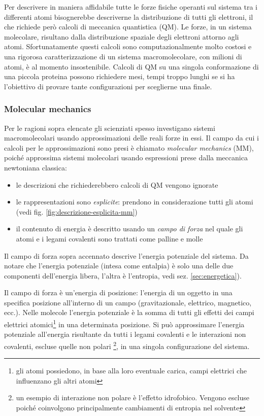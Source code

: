 \par Per descrivere in maniera affidabile tutte le forze fisiche operanti sul sistema tra i differenti atomi bisognerebbe descriverne la distribuzione di tutti gli elettroni, il che richiede però calcoli di meccanica quantistica (QM). Le forze, in un sistema molecolare, risultano dalla distribuzione spaziale degli elettroni attorno agli atomi. Sfortunatamente questi calcoli sono computazionalmente molto costosi e una rigorosa caratterizzazione di un sistema macromolecolare, con milioni di atomi, è al momento insostenibile. Calcoli di QM su una singola conformazione di una piccola proteina possono richiedere mesi, tempi troppo lunghi se si ha l'obiettivo di provare tante configurazioni per sceglierne una finale. 

\subsubsection{Molecular mechanics}

\par Per le ragioni sopra elencate gli scienziati spesso investigano sistemi macromolecolari usando approssimazioni delle reali forze in essi. Il campo da cui i calcoli per le approssimazioni sono presi è chiamato \textit{molecular mechanics} (MM), poiché approssima sistemi molecolari usando espressioni prese dalla meccanica newtoniana classica:
\begin{itemize}
	\item le descrizioni che richiederebbero calcoli di QM vengono ignorate
	\item le rappresentazioni sono \textit{esplicite}: prendono in considerazione tutti gli atomi (vedi fig. \ref{fig:descrizione-esplicita-mm})
	\item il contenuto di energia è descritto usando un \textit{campo di forza} nel quale gli atomi e i legami covalenti sono trattati come palline e molle
\end{itemize}

Il campo di forza sopra accennato descrive l'energia potenziale del sistema. Da notare che l'energia potenziale (intesa come entalpia) è solo una delle due componenti dell'energia libera, l'altra è l'entropia, vedi sez. \ref{sec:energetica}).

Il campo di forza è un'energia di posizione: l'energia di un oggetto in una specifica posizione all'interno di un campo (gravitazionale, elettrico, magnetico, ecc.). Nelle molecole l'energia potenziale è la somma di tutti gli effetti dei campi elettrici atomici\footnote{gli atomi possiedono, in base alla loro eventuale carica, campi elettrici che influenzano gli altri atomi} in una determinata posizione. Si può approssimare l'energia potenziale all'energia risultante da tutti i legami covalenti e le interazioni non covalenti, escluse quelle non polari \footnote{un esempio di interazione non polare è l'effetto idrofobico. Vengono escluse poiché coinvolgono principalmente cambiamenti di entropia nel solvente}, in una singola configurazione del sistema.

